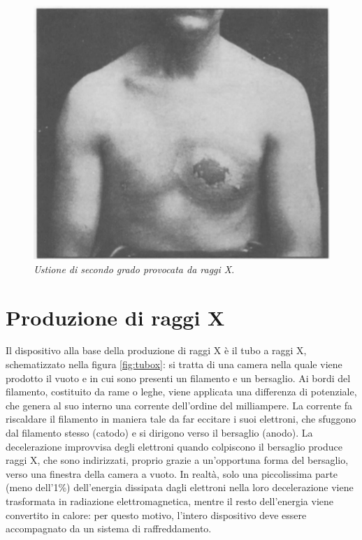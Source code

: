 \documentclass{report}
\newcommand{\figref}[1]{figura \ref{#1}}
\numberwithin{equation}{section}
\numberwithin{figure}{section}
\begin{document}
\begin{figure}[htp]
\centering
\includegraphics[scale=0.78]{immagini/ustione.png}
\caption{\label{fig:ustione} \textit{Ustione di secondo grado provocata da raggi X}.}
\end{figure}

\section{Produzione di raggi X}
Il dispositivo alla base della produzione di raggi X è il tubo a raggi X, schematizzato nella \figref{fig:tubox}: si tratta di una camera nella quale viene prodotto il vuoto e in cui sono presenti un filamento e un bersaglio. Ai bordi del filamento, costituito da rame o leghe, viene applicata una differenza di potenziale, che genera al suo interno una corrente dell'ordine del milliampere. La corrente fa riscaldare il filamento in maniera tale da far eccitare i suoi elettroni, che sfuggono dal filamento stesso (catodo) e si dirigono verso il bersaglio (anodo). La decelerazione improvvisa degli elettroni quando colpiscono il bersaglio produce raggi X, che sono indirizzati, proprio grazie a un'opportuna forma del bersaglio, verso una finestra della camera a vuoto. In realtà, solo una piccolissima parte (meno dell'1\%) dell'energia dissipata dagli elettroni nella loro decelerazione viene trasformata in radiazione elettromagnetica, mentre il resto dell'energia viene convertito in calore: per questo motivo, l'intero dispositivo deve essere accompagnato da un sistema di raffreddamento.
\end{document}
